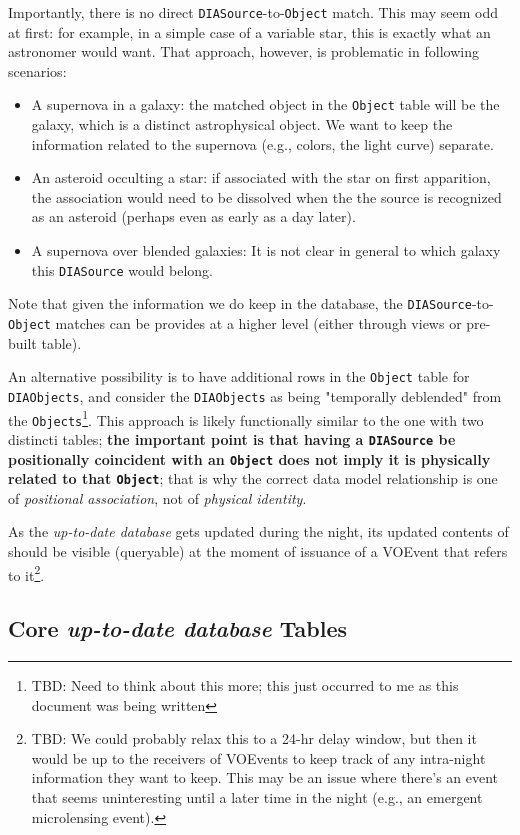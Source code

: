 \documentclass[12pt]{article}
\newcommand{\code}[1]{\texttt{#1}}
\newcommand{\DIASource}{\code{DIASource}\xspace}
\newcommand{\DIAObjects}{\code{DIAObjects}\xspace}
\newcommand{\DB}{{\em up-to-date database}\xspace}
\newcommand{\Object}{\code{Object}\xspace}
\newcommand{\Objects}{\code{Objects}\xspace}
\begin{document}
Importantly, there is no direct \DIASource-to-\Object match. This may seem odd at first: for example, in a simple case of a variable star, this is exactly what an astronomer would want. That approach, however, is problematic in following scenarios:
\begin{itemize}
\item A supernova in a galaxy: the matched object in the \Object table will be the galaxy, which is a distinct astrophysical object. We want to keep the information related to the supernova (e.g., colors, the light curve) separate.
\item An asteroid occulting a star: if associated with the star on first apparition, the association would need to be dissolved when the the source is recognized as an asteroid (perhaps even as early as a day later).
\item A supernova over blended galaxies: It is not clear in general to which galaxy this \DIASource would belong.
\end{itemize}
Note that given the information we do keep in the database, the \DIASource-to-\Object matches can be provides at a higher level (either through views or pre-built table).

An alternative possibility is to have additional rows in the \Object table for \DIAObjects, and consider the \DIAObjects as being "temporally deblended" from the \Objects\footnote{TBD: Need to think about this more; this just occurred to me as this document was being written}. This approach is likely functionally similar to the one with two distincti tables; {\bf the important point is that having a \DIASource be positionally coincident with an \Object does not imply it is physically related to that \Object}; that is why the correct data model relationship is one of {\em positional association}, not of {\em physical identity}.

As the \DB gets updated during the night, its updated contents of should be visible (queryable) at the moment of issuance of a VOEvent that refers to it\footnote{TBD: We could probably relax this to a 24-hr delay window, but then it would be up to the receivers of VOEvents to keep track of any intra-night information they want to keep. This may be an issue where there's an event that seems uninteresting until a later time in the night (e.g., an emergent microlensing event).}.

\subsection{Core \DB Tables}
\end{document}
